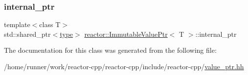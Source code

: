 \subsubsection{\texorpdfstring{internal\+\_\+ptr}{internal\_ptr}}
{\footnotesize\ttfamily template$<$class T$>$ \\
std\+::shared\+\_\+ptr$<$\hyperlink{classreactor_1_1ImmutableValuePtr_a88dbe82ff9b732b87e054ee37254bdfa}{type}$>$ \hyperlink{classreactor_1_1ImmutableValuePtr}{reactor\+::\+Immutable\+Value\+Ptr}$<$ T $>$\+::internal\+\_\+ptr\hspace{0.3cm}{\ttfamily [private]}}



The documentation for this class was generated from the following file\+:\begin{DoxyCompactItemize}
\item 
/home/runner/work/reactor-\/cpp/reactor-\/cpp/include/reactor-\/cpp/\hyperlink{value__ptr_8hh}{value\+\_\+ptr.\+hh}\end{DoxyCompactItemize}
